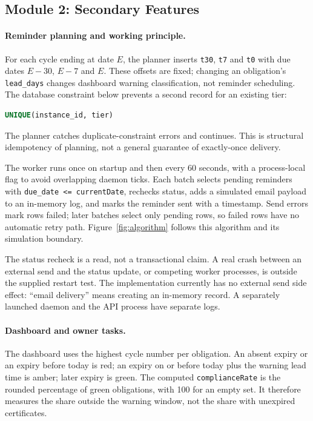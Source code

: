 \subsection{Module 2: Secondary Features}
\paragraph{Reminder planning and working principle.}
For each cycle ending at date $E$, the planner inserts \texttt{t30}, \texttt{t7} and \texttt{t0} with due dates $E-30$, $E-7$ and $E$. These offsets are fixed; changing an obligation's \texttt{lead\_days} changes dashboard warning classification, not reminder scheduling. The database constraint below prevents a second record for an existing tier:
\begin{lstlisting}[language=SQL]
UNIQUE(instance_id, tier)
\end{lstlisting}
The planner catches duplicate-constraint errors and continues. This is structural idempotency of planning, not a general guarantee of exactly-once delivery.

The worker runs once on startup and then every 60 seconds, with a process-local flag to avoid overlapping daemon ticks. Each batch selects pending reminders with \texttt{due\_date <= currentDate}, rechecks status, adds a simulated email payload to an in-memory log, and marks the reminder sent with a timestamp. Send errors mark rows failed; later batches select only pending rows, so failed rows have no automatic retry path. Figure~\ref{fig:algorithm} follows this algorithm and its simulation boundary.

The status recheck is a read, not a transactional claim. A real crash between an external send and the status update, or competing worker processes, is outside the supplied restart test. The implementation currently has no external send side effect: ``email delivery'' means creating an in-memory record. A separately launched daemon and the API process have separate logs.

\paragraph{Dashboard and owner tasks.}
The dashboard uses the highest cycle number per obligation. An absent expiry or an expiry before today is red; an expiry on or before today plus the warning lead time is amber; later expiry is green. The computed \texttt{complianceRate} is the rounded percentage of green obligations, with 100 for an empty set. It therefore measures the share outside the warning window, not the share with unexpired certificates.

